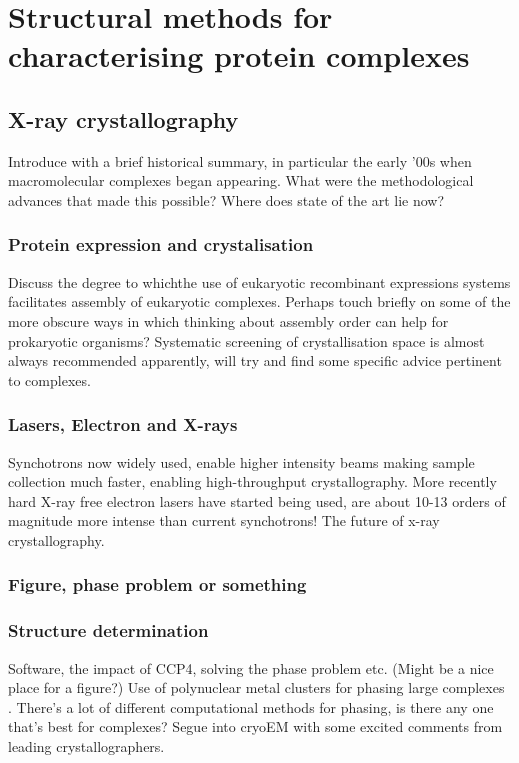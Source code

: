 \documentclass[a4paper,11pt,twoside,openright]{book}
\let\cite\supercite
\begin{document}
\section{Structural methods for characterising protein complexes}

\subsection{X-ray crystallography}
Introduce with a brief historical summary, in particular the early '00s when macromolecular complexes began appearing. What were the methodological advances that made this possible? Where does state of the art lie now?
\subsubsection{Protein expression and crystalisation}
Discuss the degree to whichthe use of eukaryotic recombinant expressions systems facilitates assembly of eukaryotic complexes. Perhaps touch briefly on some of the more obscure ways in which thinking about assembly order can help for prokaryotic organisms? Systematic screening of crystallisation space is almost always recommended apparently, will try and find some specific advice pertinent to complexes.
\subsubsection{Lasers, Electron and X-rays}
Synchotrons now widely used, enable higher intensity beams making sample collection much faster, enabling high-throughput crystallography. More recently hard X-ray free electron lasers have started being used, are about 10-13 orders of magnitude more intense than current synchotrons! The future of x-ray crystallography.

\subsubsection{Figure, phase problem or something}

\subsubsection{Structure determination}
Software, the impact of CCP4, solving the phase problem etc. (Might be a nice place for a figure?) Use of polynuclear metal clusters for phasing large complexes \cite{Dauter2005}. There's a lot of different computational methods for phasing, is there any one that's best for complexes? Segue into cryoEM with some excited comments from leading crystallographers.
\end{document}
